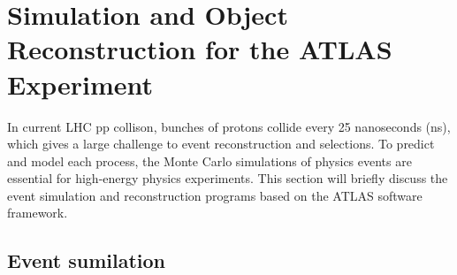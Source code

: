 \chapter{Simulation and Object Reconstruction for the ATLAS Experiment}

In current LHC pp collison, bunches of protons collide every 25 nanoseconds (ns), which gives a large challenge to event reconstruction and selections.
To predict and model each process, the Monte Carlo simulations of physics events are essential for high-energy physics experiments.
This section will briefly discuss the event simulation and reconstruction programs based on the ATLAS software framework. 

\section{Event sumilation}

